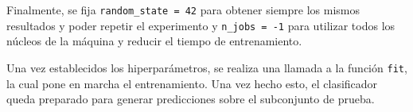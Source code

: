 Finalmente, se fija \texttt{random\_state = 42} para obtener siempre los mismos resultados y poder repetir el experimento y \texttt{n\_jobs = -1} para utilizar todos los núcleos de la máquina y reducir el tiempo de entrenamiento.

Una vez establecidos los hiperparámetros, se realiza una llamada a la función \texttt{fit}, la cual pone en marcha el entrenamiento. Una vez hecho esto, el clasificador queda preparado para generar predicciones sobre el subconjunto de prueba.